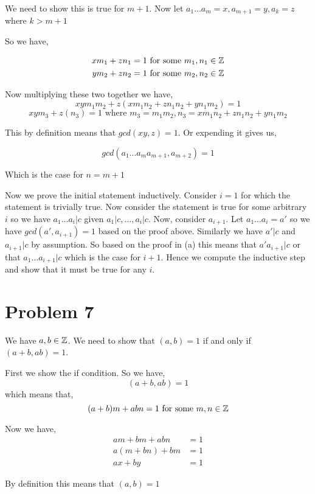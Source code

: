 \documentclass[a4paper]{report}
\begin{document}
We need to show this is true for $m + 1$. Now let  $a_1 \dots a_m = x, a_{m + 1} = y, a_{k} = z$ where $k > m + 1$

So we have,

\begin{align*}
    xm_1 + zn_1 &= 1 \text{ for some $m_1,n_1 \in \mathbb{Z}$}\\
    ym_2 + zn_2 &= 1\text{ for some $m_2,n_2 \in \mathbb{Z}$}\\
\end{align*}

Now multiplying these two together we have, 
$$ xym_1m_2 + z(xm_1n_2 + zn_1n_2 + yn_1m_2) = 1 $$ 
$$ xym_3 + z(n_3) = 1 \text{ where $m_3 = m_1m_2, n_3 = xm_1n_2 + zn_1n_2 + yn_1m_2$} $$ 

This by definition means that $gcd(xy, z) = 1$. Or expending it gives us,

$$ gcd(a_1\dots a_{m}a_{m + 1}, a_{m + 2}) = 1 $$ 


Which is the case for $n = m + 1$


Now we prove the initial statement inductively.  Consider  $i = 1$ for which the statement is trivially true. Now consider the statement is true for some arbitrary $i$  so we have  $a_1\dots a_i | c$ given $a_1 | c,\dots,a_i | c$. Now, consider $a_{i + 1}$. Let $a_1 \dots a_i = a'$ so we have  $gcd(a', a_{i + 1}) = 1$ based on the proof above. Similarly we have $a' | c$ and $a_{i + 1} | c$ by assumption. So based on the proof in (a) this means that $a' a_{i + 1}| c$ or that $a_1 \dots a_{i + 1} | c$ which is the case for $i + 1$. Hence we compute the inductive step and show that it must be true for any  $i$.



\section*{Problem 7}
We have $a, b \in \mathbb{Z}$. We need to show that  $(a, b) = 1$ if and only if  $(a + b, ab) = 1$. 

First we show the if condition. So we have, 
$$ (a + b, ab) = 1 $$  which means that, 
$$ (a + b) m + abn = 1 \text{ for some $m,n \in \mathbb{Z}$} $$ 

Now we have,
\begin{align*}
    am + bm + abn &= 1\\
    a(m + bn) + bm  &= 1\\
    ax + by &= 1
\end{align*}

By definition this means that $(a, b) = 1$
\end{document}
